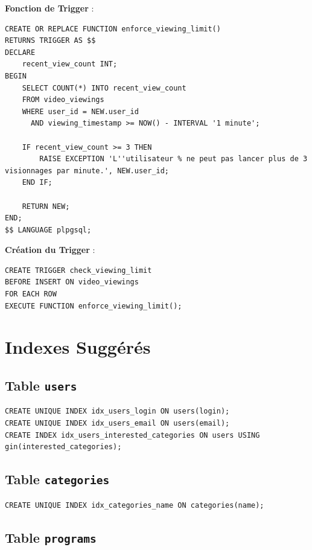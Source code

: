 \documentclass[a4paper,12pt]{article}
\begin{document}
\textbf{Fonction de Trigger} :

\begin{lstlisting}
CREATE OR REPLACE FUNCTION enforce_viewing_limit()
RETURNS TRIGGER AS $$
DECLARE
    recent_view_count INT;
BEGIN
    SELECT COUNT(*) INTO recent_view_count
    FROM video_viewings
    WHERE user_id = NEW.user_id
      AND viewing_timestamp >= NOW() - INTERVAL '1 minute';

    IF recent_view_count >= 3 THEN
        RAISE EXCEPTION 'L''utilisateur % ne peut pas lancer plus de 3 visionnages par minute.', NEW.user_id;
    END IF;

    RETURN NEW;
END;
$$ LANGUAGE plpgsql;
\end{lstlisting}

\textbf{Création du Trigger} :

\begin{lstlisting}
CREATE TRIGGER check_viewing_limit
BEFORE INSERT ON video_viewings
FOR EACH ROW
EXECUTE FUNCTION enforce_viewing_limit();
\end{lstlisting}

\section{Indexes Suggérés}

\subsection{Table \texttt{users}}

\begin{lstlisting}
CREATE UNIQUE INDEX idx_users_login ON users(login);
CREATE UNIQUE INDEX idx_users_email ON users(email);
CREATE INDEX idx_users_interested_categories ON users USING gin(interested_categories);
\end{lstlisting}

\subsection{Table \texttt{categories}}

\begin{lstlisting}
CREATE UNIQUE INDEX idx_categories_name ON categories(name);
\end{lstlisting}

\subsection{Table \texttt{programs}}
\end{document}
